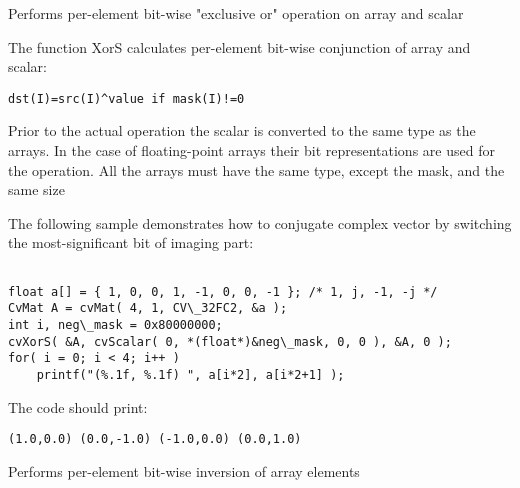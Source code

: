 
Performs per-element bit-wise "exclusive or" operation on array and scalar


\begin{description}
\end{description}


The function XorS calculates per-element bit-wise conjunction of array and scalar:

\begin{lstlisting}
dst(I)=src(I)^value if mask(I)!=0
\end{lstlisting}

Prior to the actual operation the scalar is converted to the same type as the arrays. In the case of floating-point arrays their bit representations are used for the operation. All the arrays must have the same type, except the mask, and the same size

The following sample demonstrates how to conjugate complex vector by switching the most-significant bit of imaging part:

\begin{lstlisting}

float a[] = { 1, 0, 0, 1, -1, 0, 0, -1 }; /* 1, j, -1, -j */
CvMat A = cvMat( 4, 1, CV\_32FC2, &a );
int i, neg\_mask = 0x80000000;
cvXorS( &A, cvScalar( 0, *(float*)&neg\_mask, 0, 0 ), &A, 0 );
for( i = 0; i < 4; i++ )
    printf("(%.1f, %.1f) ", a[i*2], a[i*2+1] );

\end{lstlisting}

The code should print:

\begin{lstlisting}
(1.0,0.0) (0.0,-1.0) (-1.0,0.0) (0.0,1.0)
\end{lstlisting}


Performs per-element bit-wise inversion of array elements



